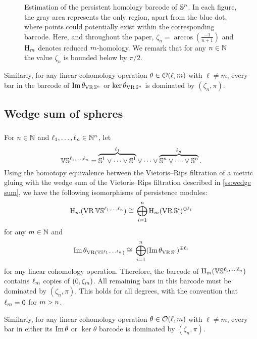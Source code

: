 \begin{figure}[ht]
	\centering
	
	\caption{Estimation of the persistent homology barcode of $\mathbb{S}^n$.
	In each figure, the gray area represents the only region, apart from the blue dot, where points could potentially exist within the corresponding barcode.
	Here, and throughout the paper, $\zeta_n = \arccos(\tfrac{-1}{n+1})$ and $\mathrm{H}_m $ denotes reduced $m$-homology.
	We remark that for any \(n \in \mathbb{N}\) the value \(\zeta_n\) is bounded below by \(\pi/2\).}
	\label{fig:Sk}
\end{figure}

Similarly, for any linear cohomology operation $\theta \in \mathcal{O}(\ell,m)$ with $\ell \neq m$, every bar in the barcode of $\operatorname{Im}\theta_{\operatorname{VR}\mathbb{S}^n}$ or $\ker\theta_{\operatorname{VR}\mathbb{S}^n}$ is dominated by $(\zeta_n,\pi)$.


\subsection{Wedge sum of spheres}

\subsubsection{}

For $n \in \mathbb{N}$ and $\ell_1, \dots, \ell_n \in \mathbb{N}^n$, let
\[
\mathbb{V}\mathbb{S}^{\ell_1,\dots,\ell_n} =
\overbrace{\mathbb{S}^1\vee\dots\vee\mathbb{S}^1}^{\ell_1} \vee\dots\vee \overbrace{\mathbb{S}^n\vee\dots\vee\mathbb{S}^n}^{\ell_n}.
\]
Using the homotopy equivalence between the Vietoris--Rips filtration of a metric gluing with the wedge sum of the Vietoris--Rips filtration described in \cref{ss:wedge sum}, we have the following isomorphisms of persistence modules:
\[
\mathrm{H}_m (\operatorname{VR}\mathbb{V}\mathbb{S}^{\ell_1,\dots,\ell_n}) \cong \, \bigoplus_{i=1}^n \mathrm{H}_m (\operatorname{VR}\mathbb{S}^i)^{\oplus \ell_i}
\]
for any \(m \in \mathbb{N}\) and
\[
\operatorname{Im}\theta_{\operatorname{VR}(\mathbb{V}\mathbb{S}^{\ell_1,\dots,\ell_n})} \cong \, \bigoplus_{i=1}^n (\operatorname{Im}\theta_{\operatorname{VR}\mathbb{S}^i})^{\oplus \ell_i}
\]
for any linear cohomology operation.
Therefore, the barcode of $\mathrm{H}_m(\mathbb{V}\mathbb{S}^{\ell_1,\dots,\ell_n})$ contains $\ell_m$ copies of $(0,\zeta_m)$.
All remaining bars in this barcode must be dominated by $(\zeta_n, \pi)$.
This holds for all degrees, with the convention that $\ell_m = 0$ for $m > n$.

Similarly, for any linear cohomology operation $\theta \in \mathcal{O}(\ell,m)$ with $\ell \neq m$, every bar in either its $\operatorname{Im}\theta$ or $\ker\theta$ barcode is dominated by $(\zeta_n, \pi)$.

